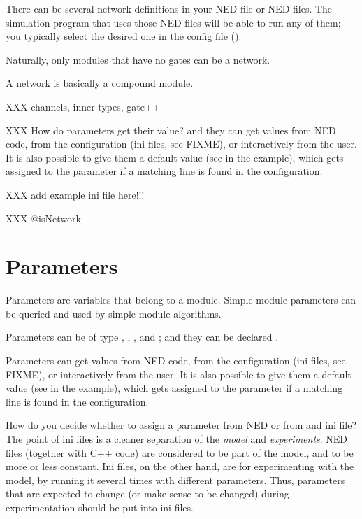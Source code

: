 There can be several network definitions in your NED file or NED files.
The simulation program that uses those NED files will be
able to run any of them; you typically select the desired one
in the config file ().

Naturally, only modules that have no gates can be a network.

A network is basically a compound module.

XXX channels, inner types, gate++

XXX How do parameters get their value? and they can get values from NED code,
from the configuration (ini files, see FIXME), or interactively from the user.
It is also possible to give them a default value (see
 in the example), which gets assigned to the parameter if a
matching  line is found in the configuration.

XXX add example ini file here!!!

XXX @isNetwork



\section{Parameters}
\label{sec:ch-ned-lang:simple-module-param}

Parameters are variables that belong to a module. Simple module
parameters can be queried and used by simple module algorithms.

Parameters can be of type , , , 
and ; and they can be declared .

Parameters can get values from NED code, from the configuration (ini files, see
FIXME), or interactively from the user. It is also possible to give them a default value (see
 in the example), which gets assigned to the parameter if a
matching  line is found in the configuration.

\begin{note}
    How do you decide whether to assign a parameter from NED or from and ini
    file? The point of ini files is a cleaner separation of the \textit{model}
    and \textit{experiments}. NED files (together with C++ code) are considered
    to be part of the model, and to be more or less constant. Ini files, on
    the other hand, are for experimenting with the model, by running it
    several times with different parameters. Thus, parameters that are expected
    to change (or make sense to be changed) during experimentation should be
    put into ini files.
\end{note}

